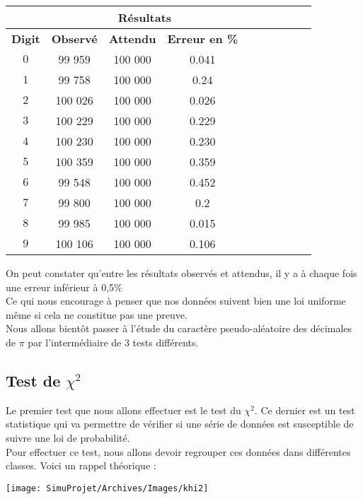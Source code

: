 \documentclass[french]{article}
\begin{document}
\begin{longtable}{|c|c|c|c|c|c|c|c|c|c|}
	\hline
	& \multicolumn{3}{c|}{\textbf{Résultats}} \\ 
	\hline 
	\textbf{Digit}  & \textbf{Observé} & \textbf{Attendu} & \textbf{Erreur en \%} \\ 
	\hline 
	$$0$$ & 99 959 & 100 000 & 0.041\\ 
	\hline 
	$$1$$ & 99 758 & 100 000 & 0.24\\ 
	\hline 
	$$2$$ & 100 026 & 100 000 & 0.026 \\ 
	\hline 
	$$3$$ & 100 229 & 100 000 & 0.229\\ 
	\hline 
	$$4$$ & 100 230 & 100 000 & 0.230\\ 
	\hline 
	$$5$$ & 100 359 & 100 000 & 0.359\\ 
	\hline 
	$$6$$ & 99 548 & 100 000 & 0.452\\ 
	\hline 
	$$7$$ & 99 800 & 100 000 & 0.2\\ 
	\hline 
	$$8$$ & 99 985 & 100 000 & 0.015\\ 
	\hline 
	$$9$$ & 100 106 & 100 000 & 0.106\\ 
	\hline
\end{longtable}

On peut constater qu'entre les résultats observés et attendus, il y a à chaque fois une
erreur inférieur à 0,5\%
\\
Ce qui nous encourage à penser que nos données suivent bien une loi uniforme même si cela ne 
constitue pas une preuve.
\\
Nous allons bientôt passer à l'étude du caractère pseudo-aléatoire des décimales de $\pi$
par l'intermédiaire de 3 tests différents.
\\
\subsection{Test de $\chi^{2}$ }
Le premier test que nous allons effectuer est le test du \textbf{$\chi^{2}$}. Ce dernier est un test statistique qui va permettre de vérifier si une série de données est susceptible de suivre une loi de probabilité.
\\
Pour effectuer ce test, nous allons devoir regrouper ces données dans différentes classes.
Voici un rappel théorique :

	\begin{center}
		\texttt{[image: SimuProjet/Archives/Images/khi2]}
	\end{center}
	
\end{document}
